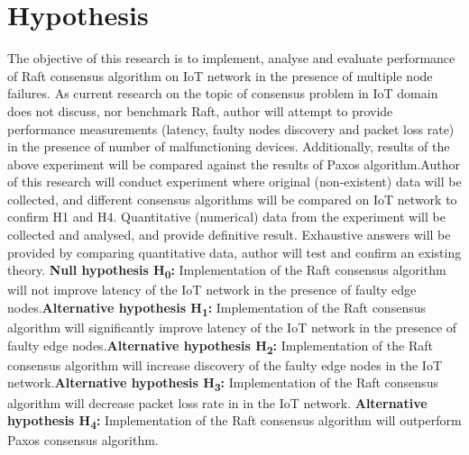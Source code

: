 \documentclass[	DIV=calc,%
							paper=a4,%
							fontsize=11pt,%
							twocolumn]{scrartcl}	 				%
\begin{document}
\section{Hypothesis}
The objective of this research is to implement, analyse and evaluate performance of Raft consensus algorithm on IoT network in the presence of multiple node failures. As current research on the topic of consensus problem in IoT domain does not discuss, nor benchmark Raft, author will attempt to provide performance measurements (latency, faulty nodes discovery and packet loss rate) in the presence of number of malfunctioning devices. Additionally, results of the above experiment will be compared against the results of Paxos algorithm.\smallskip \newline Author of this research will conduct experiment where original (non-existent) data will be collected, and different consensus algorithms will be compared on IoT network to confirm H1 and H4. Quantitative (numerical) data from the experiment will be collected and analysed, and provide definitive result. Exhaustive answers will be provided by comparing quantitative data, author will test and confirm an existing theory. 
\smallskip \newline \textbf{Null hypothesis H\textsubscript{0}:} Implementation of the Raft consensus algorithm will not improve latency of the IoT network in the presence of faulty edge nodes.\smallskip \newline \textbf{Alternative hypothesis H\textsubscript{1}:} Implementation of the Raft consensus algorithm will significantly improve latency of the IoT network in the presence of faulty edge nodes.\smallskip \newline \textbf{Alternative hypothesis H\textsubscript{2}:} Implementation of the Raft consensus algorithm will increase discovery of the faulty edge nodes in the IoT network.\smallskip \newline \textbf{Alternative hypothesis H\textsubscript{3}:} Implementation of the Raft consensus algorithm will decrease packet loss rate in  in the IoT network.
\smallskip \newline \textbf{Alternative hypothesis H\textsubscript{4}:} Implementation of the Raft consensus algorithm will outperform Paxos consensus algorithm.
\end{document}
